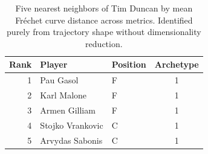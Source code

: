 \begin{table}[htbp]
  \centering\small
  \begin{tabular}{rllc}
    \toprule
    Rank & Player & Position & Archetype \\
    \midrule
    1 & Pau Gasol & F & 1 \\
    2 & Karl Malone & F & 1 \\
    3 & Armen Gilliam & F & 1 \\
    4 & Stojko Vrankovic & C & 1 \\
    5 & Arvydas Sabonis & C & 1 \\
    \bottomrule
  \end{tabular}
  \caption{Five nearest neighbors of Tim Duncan by mean Fr\'{e}chet curve distance across metrics. Identified purely from trajectory shape without dimensionality reduction.}
  \label{tab:Tim_Duncan_frechet_curve_neighbors}
\end{table}

